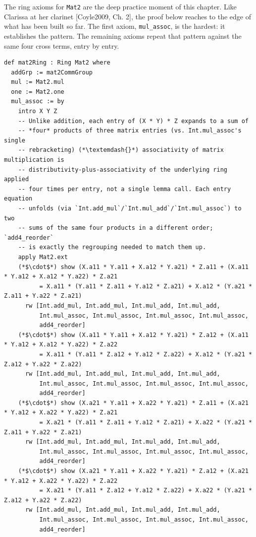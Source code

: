The ring axioms for \texttt{Mat2} are the deep practice moment of this chapter. Like Clarissa at her clarinet {[}Coyle2009, Ch. 2{]}, the proof below reaches to the edge of what has been built so far. The first axiom, \texttt{mul\_\allowbreak{}assoc}, is the hardest: it establishes the pattern. The remaining axioms repeat that pattern against the same four cross terms, entry by entry.

\begin{lstlisting}
def mat2Ring : Ring Mat2 where
  addGrp := mat2CommGroup
  mul := Mat2.mul
  one := Mat2.one
  mul_assoc := by
    intro X Y Z
    -- Unlike addition, each entry of (X * Y) * Z expands to a sum of
    -- *four* products of three matrix entries (vs. Int.mul_assoc's single
    -- rebracketing) (*\textemdash{}*) associativity of matrix multiplication is
    -- distributivity-plus-associativity of the underlying ring applied
    -- four times per entry, not a single lemma call. Each entry equation
    -- unfolds (via `Int.add_mul`/`Int.mul_add`/`Int.mul_assoc`) to two
    -- sums of the same four products in a different order; `add4_reorder`
    -- is exactly the regrouping needed to match them up.
    apply Mat2.ext
    (*$\cdot$*) show (X.a11 * Y.a11 + X.a12 * Y.a21) * Z.a11 + (X.a11 * Y.a12 + X.a12 * Y.a22) * Z.a21
          = X.a11 * (Y.a11 * Z.a11 + Y.a12 * Z.a21) + X.a12 * (Y.a21 * Z.a11 + Y.a22 * Z.a21)
      rw [Int.add_mul, Int.add_mul, Int.mul_add, Int.mul_add,
          Int.mul_assoc, Int.mul_assoc, Int.mul_assoc, Int.mul_assoc,
          add4_reorder]
    (*$\cdot$*) show (X.a11 * Y.a11 + X.a12 * Y.a21) * Z.a12 + (X.a11 * Y.a12 + X.a12 * Y.a22) * Z.a22
          = X.a11 * (Y.a11 * Z.a12 + Y.a12 * Z.a22) + X.a12 * (Y.a21 * Z.a12 + Y.a22 * Z.a22)
      rw [Int.add_mul, Int.add_mul, Int.mul_add, Int.mul_add,
          Int.mul_assoc, Int.mul_assoc, Int.mul_assoc, Int.mul_assoc,
          add4_reorder]
    (*$\cdot$*) show (X.a21 * Y.a11 + X.a22 * Y.a21) * Z.a11 + (X.a21 * Y.a12 + X.a22 * Y.a22) * Z.a21
          = X.a21 * (Y.a11 * Z.a11 + Y.a12 * Z.a21) + X.a22 * (Y.a21 * Z.a11 + Y.a22 * Z.a21)
      rw [Int.add_mul, Int.add_mul, Int.mul_add, Int.mul_add,
          Int.mul_assoc, Int.mul_assoc, Int.mul_assoc, Int.mul_assoc,
          add4_reorder]
    (*$\cdot$*) show (X.a21 * Y.a11 + X.a22 * Y.a21) * Z.a12 + (X.a21 * Y.a12 + X.a22 * Y.a22) * Z.a22
          = X.a21 * (Y.a11 * Z.a12 + Y.a12 * Z.a22) + X.a22 * (Y.a21 * Z.a12 + Y.a22 * Z.a22)
      rw [Int.add_mul, Int.add_mul, Int.mul_add, Int.mul_add,
          Int.mul_assoc, Int.mul_assoc, Int.mul_assoc, Int.mul_assoc,
          add4_reorder]

\end{lstlisting}
